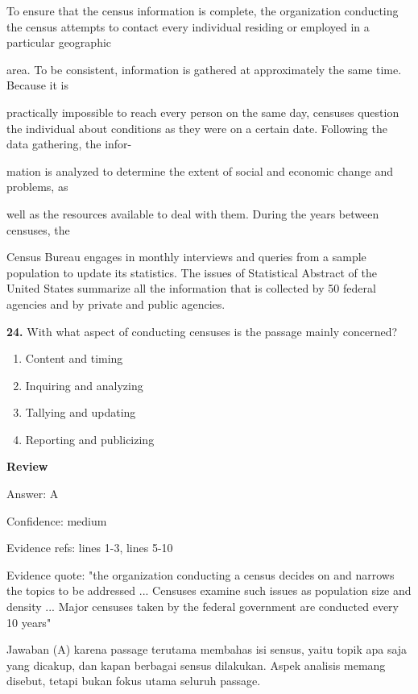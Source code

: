\documentclass[12pt]{article}
\begin{document}
To ensure that the census information is complete, the organization conducting the census attempts to contact every individual residing or employed in a particular geographic\par
area. To be consistent, information is gathered at approximately the same time. Because it is\par
practically impossible to reach every person on the same day, censuses question the individual about conditions as they were on a certain date. Following the data gathering, the infor-\par
mation is analyzed to determine the extent of social and economic change and problems, as\par
well as the resources available to deal with them. During the years between censuses, the\par
Census Bureau engages in monthly interviews and queries from a sample population to update its statistics. The issues of Statistical Abstract of the United States summarize all the information that is collected by 50 federal agencies and by private and public agencies.\par
\endgroup
\medskip
\noindent\textbf{24.} With what aspect of conducting censuses is the passage mainly concerned?
\begin{enumerate}[label=(\Alph*),leftmargin=*,itemsep=0.2em]
\item Content and timing
\item Inquiring and analyzing
\item Tallying and updating
\item Reporting and publicizing
\end{enumerate}
\par
\begingroup
\setlength{\parskip}{0pt}
\setlength{\parindent}{0pt}
\textbf{Review}\par
Answer: A\par
Confidence: medium\par
Evidence refs: lines 1-3, lines 5-10\par
Evidence quote: "the organization conducting a census decides on and narrows the topics to be addressed ... Censuses examine such issues as population size and density ... Major censuses taken by the federal government are conducted every 10 years"\par
Jawaban (A) karena passage terutama membahas isi sensus, yaitu topik apa saja yang dicakup, dan kapan berbagai sensus dilakukan. Aspek analisis memang disebut, tetapi bukan fokus utama seluruh passage.\par
\end{document}
